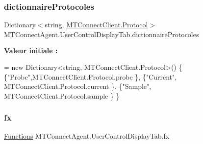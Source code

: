 \subsubsection{\texorpdfstring{dictionnaire\+Protocoles}{dictionnaireProtocoles}}
{\footnotesize\ttfamily Dictionary$<$string, \mbox{\hyperlink{class_m_t_connect_agent_1_1_b_l_l_1_1_m_t_connect_client_a2f390f74a0ad3ee5147e9438ceed6474}{M\+T\+Connect\+Client.\+Protocol}}$>$ M\+T\+Connect\+Agent.\+User\+Control\+Display\+Tab.\+dictionnaire\+Protocoles\hspace{0.3cm}{\ttfamily [private]}}

{\bfseries Valeur initiale \+:}
\begin{DoxyCode}
= \textcolor{keyword}{new} Dictionary<string, MTConnectClient.Protocol>()
        \{
            \{\textcolor{stringliteral}{"Probe"},MTConnectClient.Protocol.probe \},
            \{\textcolor{stringliteral}{"Current"}, MTConnectClient.Protocol.current \},
            \{\textcolor{stringliteral}{"Sample"}, MTConnectClient.Protocol.sample \}
        \}
\end{DoxyCode}
\mbox{\label{class_m_t_connect_agent_1_1_user_control_display_tab_addffe628fc1709f3f186bdaa1946e558}} 
\subsubsection{\texorpdfstring{fx}{fx}}
{\footnotesize\ttfamily \mbox{\hyperlink{class_m_t_connect_agent_1_1_user_control_display_tab_a39c6241e9b8ef40634f8340676d557ec}{Functions}} M\+T\+Connect\+Agent.\+User\+Control\+Display\+Tab.\+fx\hspace{0.3cm}{\ttfamily [private]}}

\mbox{\label{class_m_t_connect_agent_1_1_user_control_display_tab_a4e0ab361176edf2f0a3b1f7bf0fe4f5d}} 
